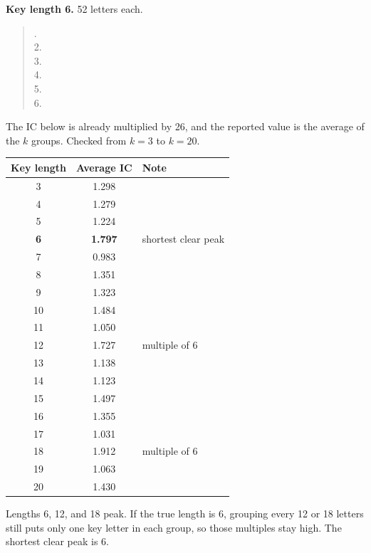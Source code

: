 \documentclass[12pt]{article}
\begin{document}
\begin{answer}
    \textbf{Key length 6.} 52 letters each.
    \begin{quote}\scriptsize{}.\ \\
    2.\ \\
    3.\ \\
    4.\ \\
    5.\ \\
    6.\ 
    \end{quote}

    The IC below is already multiplied by 26, and the reported value is the average of the \(k\) groups. Checked from \(k=3\) to \(k=20\).

    \begin{center}
    \small
    \begin{tabular}{c c l}
    \hline
    Key length & Average IC & Note \\
    \hline
    3 & 1.298 & \\
    4 & 1.279 & \\
    5 & 1.224 & \\
    \textbf{6} & \textbf{1.797} & shortest clear peak \\
    7 & 0.983 & \\
    8 & 1.351 & \\
    9 & 1.323 & \\
    10 & 1.484 & \\
    11 & 1.050 & \\
    12 & 1.727 & multiple of 6 \\
    13 & 1.138 & \\
    14 & 1.123 & \\
    15 & 1.497 & \\
    16 & 1.355 & \\
    17 & 1.031 & \\
    18 & 1.912 & multiple of 6 \\
    19 & 1.063 & \\
    20 & 1.430 & \\
    \hline
    \end{tabular}
    \end{center}

    Lengths 6, 12, and 18 peak. If the true length is 6, grouping every 12 or 18 letters still puts only one key letter in each group, so those multiples stay high. The shortest clear peak is 6.


\end{answer}
\end{document}
